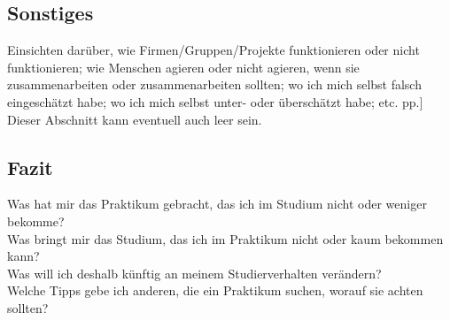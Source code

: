 \documentclass[pdftex,12pt,a4paper]{scrreprt}
\begin{document}
\subsection{Sonstiges}
Einsichten darüber, wie Firmen/Gruppen/Projekte funktionieren oder nicht funktionieren;
wie Menschen agieren oder nicht agieren, wenn sie zusammenarbeiten oder
zusammenarbeiten sollten; wo ich mich selbst falsch eingeschätzt habe; wo ich mich
selbst unter- oder überschätzt habe; etc. pp.]\\
Dieser Abschnitt kann eventuell auch leer sein.

\subsection{Fazit}
Was hat mir das Praktikum gebracht, das ich im Studium nicht oder weniger bekomme?\\
Was bringt mir das Studium, das ich im Praktikum nicht oder kaum bekommen kann?\\
Was will ich deshalb künftig an meinem Studierverhalten verändern?\\
Welche Tipps gebe ich anderen, die ein Praktikum suchen, worauf sie achten sollten?\\
\end{document}
